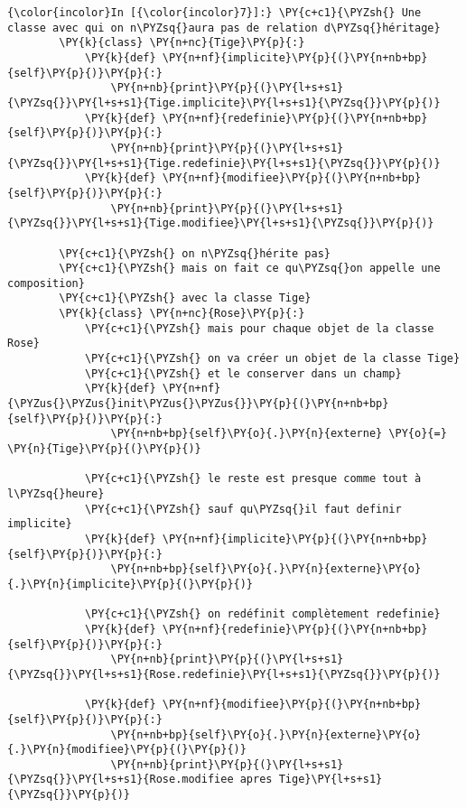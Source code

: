     \begin{Verbatim}[commandchars=\\\{\},frame=single,framerule=0.3mm,rulecolor=\color{cellframecolor}]
{\color{incolor}In [{\color{incolor}7}]:} \PY{c+c1}{\PYZsh{} Une classe avec qui on n\PYZsq{}aura pas de relation d\PYZsq{}héritage}
        \PY{k}{class} \PY{n+nc}{Tige}\PY{p}{:}
            \PY{k}{def} \PY{n+nf}{implicite}\PY{p}{(}\PY{n+nb+bp}{self}\PY{p}{)}\PY{p}{:}
                \PY{n+nb}{print}\PY{p}{(}\PY{l+s+s1}{\PYZsq{}}\PY{l+s+s1}{Tige.implicite}\PY{l+s+s1}{\PYZsq{}}\PY{p}{)}
            \PY{k}{def} \PY{n+nf}{redefinie}\PY{p}{(}\PY{n+nb+bp}{self}\PY{p}{)}\PY{p}{:}
                \PY{n+nb}{print}\PY{p}{(}\PY{l+s+s1}{\PYZsq{}}\PY{l+s+s1}{Tige.redefinie}\PY{l+s+s1}{\PYZsq{}}\PY{p}{)}
            \PY{k}{def} \PY{n+nf}{modifiee}\PY{p}{(}\PY{n+nb+bp}{self}\PY{p}{)}\PY{p}{:}
                \PY{n+nb}{print}\PY{p}{(}\PY{l+s+s1}{\PYZsq{}}\PY{l+s+s1}{Tige.modifiee}\PY{l+s+s1}{\PYZsq{}}\PY{p}{)}
        
        \PY{c+c1}{\PYZsh{} on n\PYZsq{}hérite pas}
        \PY{c+c1}{\PYZsh{} mais on fait ce qu\PYZsq{}on appelle une composition}
        \PY{c+c1}{\PYZsh{} avec la classe Tige}
        \PY{k}{class} \PY{n+nc}{Rose}\PY{p}{:}
            \PY{c+c1}{\PYZsh{} mais pour chaque objet de la classe Rose}
            \PY{c+c1}{\PYZsh{} on va créer un objet de la classe Tige}
            \PY{c+c1}{\PYZsh{} et le conserver dans un champ}
            \PY{k}{def} \PY{n+nf}{\PYZus{}\PYZus{}init\PYZus{}\PYZus{}}\PY{p}{(}\PY{n+nb+bp}{self}\PY{p}{)}\PY{p}{:}
                \PY{n+nb+bp}{self}\PY{o}{.}\PY{n}{externe} \PY{o}{=} \PY{n}{Tige}\PY{p}{(}\PY{p}{)}
        
            \PY{c+c1}{\PYZsh{} le reste est presque comme tout à l\PYZsq{}heure}
            \PY{c+c1}{\PYZsh{} sauf qu\PYZsq{}il faut definir implicite}
            \PY{k}{def} \PY{n+nf}{implicite}\PY{p}{(}\PY{n+nb+bp}{self}\PY{p}{)}\PY{p}{:}
                \PY{n+nb+bp}{self}\PY{o}{.}\PY{n}{externe}\PY{o}{.}\PY{n}{implicite}\PY{p}{(}\PY{p}{)}
                
            \PY{c+c1}{\PYZsh{} on redéfinit complètement redefinie}
            \PY{k}{def} \PY{n+nf}{redefinie}\PY{p}{(}\PY{n+nb+bp}{self}\PY{p}{)}\PY{p}{:}
                \PY{n+nb}{print}\PY{p}{(}\PY{l+s+s1}{\PYZsq{}}\PY{l+s+s1}{Rose.redefinie}\PY{l+s+s1}{\PYZsq{}}\PY{p}{)}
                
            \PY{k}{def} \PY{n+nf}{modifiee}\PY{p}{(}\PY{n+nb+bp}{self}\PY{p}{)}\PY{p}{:}
                \PY{n+nb+bp}{self}\PY{o}{.}\PY{n}{externe}\PY{o}{.}\PY{n}{modifiee}\PY{p}{(}\PY{p}{)}
                \PY{n+nb}{print}\PY{p}{(}\PY{l+s+s1}{\PYZsq{}}\PY{l+s+s1}{Rose.modifiee apres Tige}\PY{l+s+s1}{\PYZsq{}}\PY{p}{)}
\end{Verbatim}


